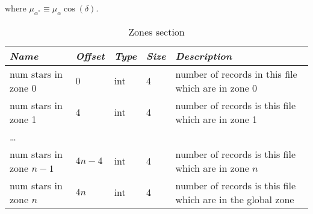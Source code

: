 where $\mu_{\alpha^*}\equiv\mu_{\alpha}\cos{(\delta)}$.

\begin{table}[htbp]
\begin{tabularx}{\textwidth}{llllX}\toprule
\emph{Name} & \emph{Offset} & \emph{Type} & \emph{Size} &\emph{Description}\\\midrule
num stars in zone 0     & 0      & int & 4 &  number of records in this file which are in zone 0\\%
num stars in zone 1     & 4      & int & 4 &  number of records is this file which are in zone 1\\
\ldots                  &        &     &   &\\
num stars in zone $n-1$ & $4n-4$ & int & 4 &  number of records is this file which are in zone $n$\\\bottomrule
num stars in zone $n$   & $4n$   & int & 4 &  number of records is this file which are in the global zone\\\bottomrule
\end{tabularx}
\caption{Zones section}
\label{tab:Catalogues:stars:record:zones}
\end{table}


